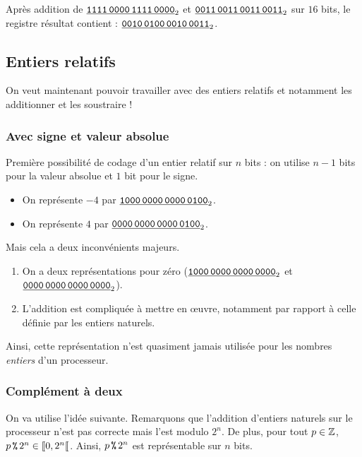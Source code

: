 \begin{exemple}
  Après addition de $\underline{\text{\texttt{1111\,0000\,1111\,0000}}}_{2}$ et
  $\underline{\text{\texttt{0011\,0011\,0011\,0011}}}_{2}$ sur $16$ bits, le registre résultat contient :
  $\underline{\text{\texttt{0010\,0100\,0010\,0011}}}_{2}$.
\end{exemple}
   
\subsection{Entiers relatifs}

On veut maintenant pouvoir travailler avec des entiers relatifs et notamment les additionner et les soustraire !

\subsubsection{Avec signe et valeur absolue}

Première possibilité de codage d'un entier relatif sur $n$ bits : on utilise $n-1$ bits pour la valeur absolue et
$1$ bit pour le signe.
\begin{exemple}
\begin{itemize}
\item[\textbullet] On représente $-4$ par $\underline{\text{\texttt{1000\,0000\,0000\,0100}}}_{2}$.
\item[\textbullet] On représente $4$ par $\underline{\text{\texttt{0000\,0000\,0000\,0100}}}_{2}$.
\end{itemize}  
\end{exemple}

Mais cela a deux inconvénients majeurs.
\begin{enumerate}
\item On a deux représentations pour zéro ($\underline{\text{\texttt{1000\,0000\,0000\,0000}}}_{2}$
  et $\underline{\text{\texttt{0000\,0000\,0000\,0000}}}_{2}$).
\item L'addition est compliquée à mettre en {\oe}uvre, notamment par rapport à celle définie par les entiers naturels.
\end{enumerate}

Ainsi, cette représentation n'est quasiment jamais utilisée pour les nombres
\emph{entiers} d'un processeur.
\subsubsection{Complément à deux}

On va utilise l'idée suivante. Remarquons que l'addition d'entiers naturels sur le processeur n'est pas
  correcte mais l'est modulo $2^{n}$. De plus, pour tout $p\in \mathbb{Z}$, $p\operatorname{\texttt{\%}} 2^{n} \in [\![0,2^{n}[\![$. 
  Ainsi, $p\operatorname{\texttt{\%}} 2^{n}$ est représentable sur $n$ bits.
  

